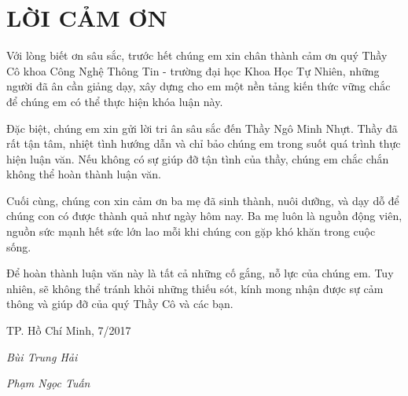 \newpage
\chapter*{LỜI CẢM ƠN}

Với lòng biết ơn sâu sắc, trước hết chúng em xin chân thành cảm ơn quý Thầy Cô khoa Công Nghệ Thông Tin - trường đại học Khoa Học Tự Nhiên, những người đã ân cần giảng dạy, xây dựng cho em một nền tảng kiến thức vững chắc để chúng em có thể thực hiện khóa luận này.

Đặc biệt, chúng em xin gửi lời tri ân sâu sắc đến Thầy Ngô Minh Nhựt. Thầy đã rất tận tâm, nhiệt tình hướng dẫn và chỉ bảo chúng em trong suốt quá trình thực hiện luận văn. Nếu không có sự giúp đỡ tận tình của thầy, chúng em chắc chắn không thể hoàn thành luận văn.

Cuối cùng, chúng con xin cảm ơn ba mẹ đã sinh thành, nuôi dưỡng, và dạy dỗ để chúng con có được thành quả như ngày hôm nay. Ba mẹ luôn là nguồn động viên, nguồn sức mạnh hết sức lớn lao mỗi khi chúng con gặp khó khăn trong cuộc sống.

Để hoàn thành luận văn này là tất cả những cố gắng, nỗ lực của chúng em. Tuy nhiên, sẽ không thể tránh khỏi những thiếu sót, kính mong nhận được sự cảm thông và giúp đỡ của quý Thầy Cô và các bạn.

\hfill TP. Hồ Chí Minh, 7/2017

\hfill \textit{Bùi Trung Hải}

\hfill \textit{Phạm Ngọc Tuấn}
